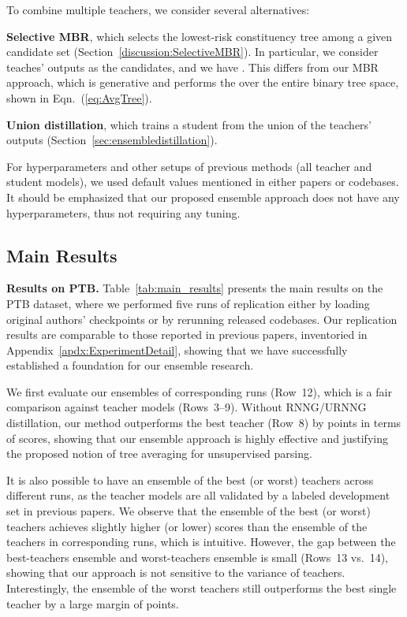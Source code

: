 \documentclass{article}
\begin{document}
To combine multiple teachers, we consider several alternatives:
\begin{compactitem}[\quad]
\item \textbf{Selective MBR}, which selects the lowest-risk constituency tree among a given candidate set (Section~\ref{discussion:SelectiveMBR}). In particular, we consider teaches' outputs as the candidates, and we have     . This differs from our MBR approach, which is generative and performs the  over the entire binary tree space, shown in Eqn.~(\ref{eq:AvgTree}).

\item \textbf{Union distillation}, which trains a student from the union of the teachers' outputs (Section~\ref{sec:ensembledistillation}).
\end{compactitem}

For hyperparameters and other setups of previous methods (all teacher and student models), we used default values mentioned in either papers or codebases. It should be emphasized that our proposed ensemble approach does not have any hyperparameters, thus not requiring any tuning.


\subsection{Main Results}


\textbf{Results on PTB.} Table~\ref{tab:main_results} presents the main results on the PTB dataset, where we performed five runs of replication either by loading original authors' checkpoints or by rerunning released codebases. Our replication results are comparable to those reported in previous papers, inventoried in Appendix~\ref{apdx:ExperimentDetail}, showing that we have successfully established a foundation for our ensemble research.

We first evaluate our ensembles of corresponding runs (Row~12), which is a fair comparison against teacher models (Rows~3--9). Without RNNG/URNNG distillation, our method outperforms the best teacher (Row~8) by  points in terms of  scores, showing that our ensemble approach is highly effective and justifying the proposed notion of tree averaging for unsupervised parsing. 

It is also possible to have an ensemble of the best (or worst) teachers across different runs, as the teacher models are all validated by a labeled development set in previous papers. We observe that the ensemble of the best (or worst) teachers achieves slightly higher (or lower) scores than the ensemble of the teachers in corresponding runs, which is intuitive. However, the gap between the best-teachers ensemble and worst-teachers ensemble is small (Rows~13 vs.~14), showing that our approach is not sensitive to the variance of teachers. Interestingly, the ensemble of the worst teachers still outperforms the best single teacher by a large margin of   points. 
\end{document}
